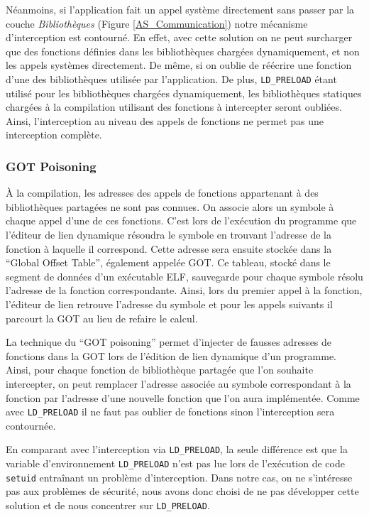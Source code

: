 Néanmoins, si l'application fait un appel système directement sans
passer par la couche \textit{Bibliothèques} (Figure
\ref{AS_Communication}) notre mécanisme d'interception est
contourné. En effet, avec cette solution on ne peut surcharger que des
fonctions définies dans les bibliothèques chargées dynamiquement, et
non les appels systèmes directement. De même, si on oublie de réécrire
une fonction d'une des bibliothèques utilisée par l'application. De
plus, \texttt{LD\_PRELOAD} étant utilisé pour les bibliothèques
chargées dynamiquement, les bibliothèques statiques chargées à la
compilation utilisant des fonctions à intercepter seront
oubliées. Ainsi, l'interception au niveau des appels de fonctions ne
permet pas une interception complète.

\subsubsection{GOT Poisoning}

À la compilation, les adresses des appels de fonctions appartenant à des bibliothèques partagées ne sont pas connues. On associe alors un symbole à chaque appel d'une de ces fonctions. C'est lors de l'exécution du programme que l'éditeur de lien dynamique résoudra le symbole en trouvant l'adresse de la fonction à laquelle il correspond. Cette adresse sera ensuite stockée dans la ``Global Offset Table''\citep{ELF}, également appelée GOT. Ce tableau, stocké dans le segment de données d'un exécutable ELF, sauvegarde pour chaque symbole résolu l'adresse de la fonction correspondante. Ainsi, lors du premier appel à la fonction, l'éditeur de lien retrouve l'adresse du symbole et pour les appels suivants il parcourt la GOT au lieu de refaire le calcul.

La technique du ``GOT poisoning'' \citep{GOT_poisoning} permet d'injecter de fausses adresses de fonctions dans la GOT lors de l'édition de lien dynamique d'un programme. Ainsi, pour chaque fonction de bibliothèque partagée que l'on souhaite intercepter, on peut remplacer l'adresse associée au symbole correspondant à la fonction par l'adresse d'une nouvelle fonction que l'on aura implémentée. Comme avec \texttt{LD\_PRELOAD} il ne faut pas oublier de fonctions sinon l'interception sera contournée.

En comparant avec l'interception via \texttt{LD\_PRELOAD}, la seule différence est que la variable d'environnement \texttt{LD\_PRELOAD} n'est pas lue lors de l'exécution de code \texttt{setuid} entraînant un problème d'interception. Dans notre cas, on ne s'intéresse pas aux problèmes de sécurité, nous avons donc choisi de ne pas développer cette solution et de nous concentrer sur \texttt{LD\_PRELOAD}.

\vspace{0.5cm}
